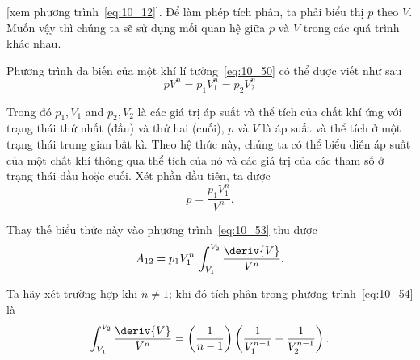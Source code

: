 [xem phương trình~\eqref{eq:10_12}]. Để làm phép tích phân, ta phải biểu thị $p$ theo $V$. Muốn vậy thì chúng ta sẽ sử dụng mối quan hệ giữa $p$ và $V$ trong các quá trình khác nhau. 


Phương trình đa biến của một khí lí tưởng~\eqref{eq:10_50} có thể được viết như sau
\begin{equation*}
	pV^n = p_1V_1^n = p_2V_2^n
\end{equation*}

\noindent

Trong đó $ p_1, V_1$ and $ p_2, V_2$ là các giá trị áp suất và thể tích của chất khí ứng với trạng thái thứ nhất (đầu) và thứ hai (cuối), $p$ và $V$ là áp suất và thể tích ở một trạng thái trung gian bất kì. Theo hệ thức này, chúng ta có thể biểu diễn áp suất của một chất khí thông qua thể tích của nó và các giá trị của các tham số ở trạng thái đầu hoặc cuối. Xét phần đầu tiên, ta được
\begin{equation*}
	p = \frac{p_1V_1^n}{V^n}.
\end{equation*}

\noindent

Thay thế biểu thức này vào phương trình~\eqref{eq:10_53} thu được 
\begin{equation}\label{eq:10_54}
	A_{12} = p_1 V_1^n\, \int_{V_1}^{V_2} \frac{\deriv{V}}{V^n}.
\end{equation}

\noindent

Ta hãy xét trường hợp khi $n\neq 1$; khi đó tích phân trong phương trình~\eqref{eq:10_54} là  
\begin{equation*}
	\int_{V_1}^{V_2} \frac{\deriv{V}}{V^n} = \left(\frac{1}{n-1}\right) \left(\frac{1}{V_1^{n-1}} - \frac{1}{V_2^{n-1}}\right).
\end{equation*}

\noindent

